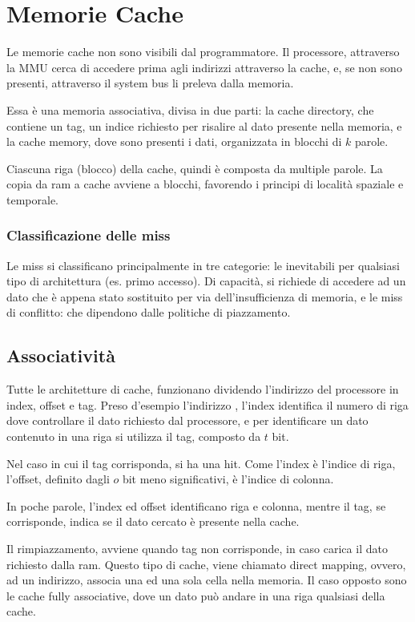 \documentclass[../template]{subfiles}
\begin{document}
\section{Memorie Cache}
Le memorie cache non sono visibili dal programmatore.
Il processore, attraverso la MMU cerca di accedere prima agli indirizzi attraverso la cache, e, se non sono presenti, attraverso il system bus li preleva dalla memoria.

Essa è una memoria associativa, divisa in due parti: la cache directory, che contiene un tag, un indice richiesto per risalire al dato presente nella memoria, e la cache memory, dove sono presenti i dati, organizzata in blocchi di $k$ parole.

Ciascuna riga (blocco) della cache, quindi è composta da multiple parole. La copia da ram a cache avviene a blocchi, favorendo i principi di località spaziale e temporale.

\subsubsection{Classificazione delle miss}
Le miss si classificano principalmente in tre categorie: le inevitabili per qualsiasi tipo di architettura (es. primo accesso).
Di capacità, si richiede di accedere ad un dato che è appena stato sostituito per via dell'insufficienza di memoria, e le miss di conflitto: che dipendono dalle politiche di piazzamento.


\subsection{Associatività}
Tutte le architetture di cache, funzionano dividendo l'indirizzo del processore in index, offset e tag.
Preso d'esempio l'indirizzo , l'index identifica il numero di riga dove controllare il dato richiesto dal processore, e per identificare un dato contenuto in una riga si utilizza il tag, composto da $t$ bit.

Nel caso in cui il tag corrisponda, si ha una hit. Come l'index è l'indice di riga, l'offset, definito dagli $o$ bit meno significativi,  è l'indice di colonna.


In poche parole, l'index ed offset identificano riga e colonna, mentre il tag, se corrisponde, indica se il dato cercato è presente nella cache.

Il rimpiazzamento, avviene quando tag non corrisponde, in caso carica il dato richiesto dalla ram.
Questo tipo di cache, viene chiamato direct mapping, ovvero, ad un indirizzo, associa una ed una sola cella nella memoria.
Il caso opposto sono le cache fully associative, dove un dato può andare in una riga qualsiasi della cache.
\end{document}
